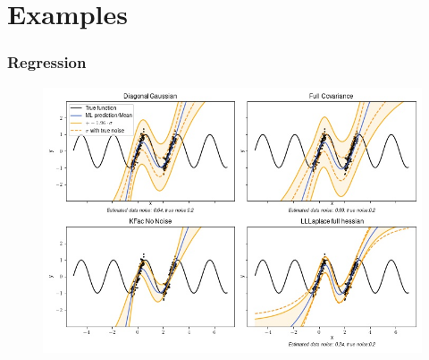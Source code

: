 \documentclass{beamer}
\begin{document}
        \section{Examples}

        \begin{frame}
            \frametitle{Regression}
            \begin{figure}
                \includegraphics[width=\textwidth]{images/Regression/kernel_comparison.jpg}
            \end{figure}
        \end{frame}
        
\end{document}
